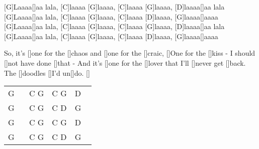 \begin{guitar}
	[G]Laaaa[]aa lala, [C]laaaa [G]laaaa, [C]laaaa [G]laaaa, [D]laaaa[]aa lala
	[G]Laaaa[]aa lala, [C]laaaa [G]laaaa, [C]laaaa [D]laaaa, [G]laaaa[]aaaa
	[G]Laaaa[]aa lala, [C]laaaa [G]laaaa, [C]laaaa [G]laaaa, [D]laaaa[]aa lala
	[G]Laaaa[]aa lala, [C]laaaa [G]laaaa, [C]laaaa [D]laaaa, [G]laaaa[]aaaa
	
	 
	So, it's []one for the []chaos and []one for the []craic,
	[]One for the []kiss - I should []not have done []that -
	And it's []one for the []lover that I'll []never get []back. 
	The []doodles []I'd un[]do. []{}
	
	{\footnotesize\begin{tabular}{|l|l|l|l|}
			G ~ & C G & C G & D ~ \\
			G & C G & C D & G \\
			G & C G & C G & D \\
			G & C G & C D & G 
	\end{tabular}}
	
	\begin{highlightbar}
		 
	\end{highlightbar}
\end{guitar}